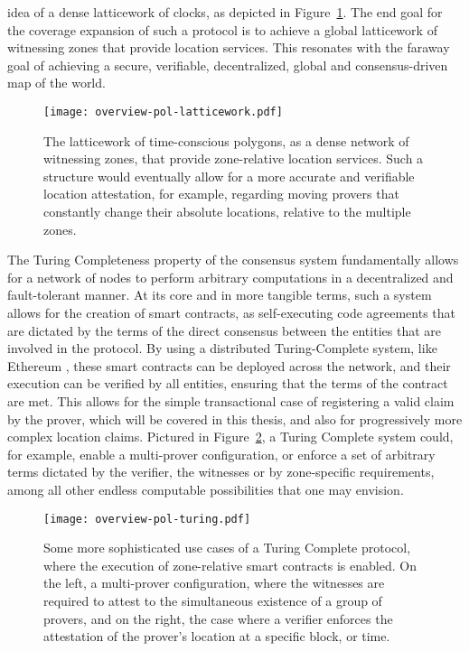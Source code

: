 idea of a dense latticework of clocks, as depicted in Figure~\ref{fig:proof-of-location-overview-latticework}. The end goal for the coverage expansion of such a \pol{} protocol is to achieve a global latticework of witnessing zones that provide location services. This resonates with the faraway goal of achieving a secure, verifiable, decentralized, global and consensus-driven map of the world.

\begin{figure}[ht]
    \begin{center}
    \texttt{[image: overview-pol-latticework.pdf]}
    \caption{The latticework of time-conscious polygons, as a dense network of witnessing zones, that provide zone-relative location services. Such a structure would eventually allow for a more accurate and verifiable location attestation, for example, regarding moving provers that constantly change their absolute locations, relative to the multiple zones.}
    \label{fig:proof-of-location-overview-latticework}
    \end{center}
\end{figure}

The Turing Completeness property of the consensus system fundamentally allows for a network of nodes to perform arbitrary computations in a decentralized and fault-tolerant manner. At its core and in more tangible terms, such a system allows for the creation of smart contracts, as self-executing code agreements that are dictated by the terms of the direct consensus between the entities that are involved in the \pol{} protocol. By using a distributed Turing-Complete system, like Ethereum \cite{buterin2014next}, these smart contracts can be deployed across the network, and their execution can be verified by all entities, ensuring that the terms of the contract are met. This allows for the simple transactional case of registering a valid \pol{} claim by the prover, which will be covered in this thesis, and also for progressively more complex location claims. Pictured in Figure~\ref{fig:proof-of-location-overview-turing}, a Turing Complete system could, for example, enable a multi-prover configuration, or enforce a set of arbitrary terms dictated by the verifier, the witnesses or by zone-specific requirements, among all other endless computable possibilities that one may envision. 

\begin{figure}[ht]
    \begin{center}
    \texttt{[image: overview-pol-turing.pdf]}
    \caption{Some more sophisticated use cases of a Turing Complete \pol{} protocol, where the execution of zone-relative smart contracts is enabled. On the left, a multi-prover configuration, where the witnesses are required to attest to the simultaneous existence of a group of provers, and on the right, the case where a verifier enforces the attestation of the prover's location at a specific block, or time.}
    \label{fig:proof-of-location-overview-turing}
    \end{center}
\end{figure}

